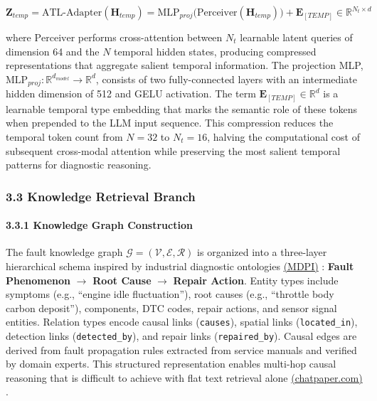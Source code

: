 \documentclass[
  11pt,
]{article}
\begin{document}
\[ \mathbf{Z}_{temp} = \text{ATL-Adapter}(\mathbf{H}_{temp}) = \text{MLP}_{proj}\bigl(\text{Perceiver}(\mathbf{H}_{temp})\bigr) + \mathbf{E}_{[TEMP]} \in \mathbb{R}^{N_t \times d} \tag{2} \]

where \(\text{Perceiver}\) performs cross-attention between \(N_t\)
learnable latent queries of dimension 64 and the \(N\) temporal hidden
states, producing compressed representations that aggregate salient
temporal information. The projection MLP,
\(\text{MLP}_{proj}: \mathbb{R}^{d_{model}} \rightarrow \mathbb{R}^{d}\),
consists of two fully-connected layers with an intermediate hidden
dimension of 512 and GELU activation. The term
\(\mathbf{E}_{[TEMP]} \in \mathbb{R}^{d}\) is a learnable temporal type
embedding that marks the semantic role of these tokens when prepended to
the LLM input sequence. This compression reduces the temporal token
count from \(N = 32\) to \(N_t = 16\), halving the computational cost of
subsequent cross-modal attention while preserving the most salient
temporal patterns for diagnostic reasoning.

\subsubsection{3.3 Knowledge Retrieval
Branch}\label{knowledge-retrieval-branch}

\paragraph{3.3.1 Knowledge Graph
Construction}\label{knowledge-graph-construction}

The fault knowledge graph
\(\mathcal{G} = (\mathcal{V}, \mathcal{E}, \mathcal{R})\) is organized
into a three-layer hierarchical schema inspired by industrial diagnostic
ontologies \href{https://www.mdpi.com/2079-9292/14/21/4180}{(MDPI)} :
\textbf{Fault Phenomenon} \(\rightarrow\) \textbf{Root Cause}
\(\rightarrow\) \textbf{Repair Action}. Entity types include symptoms
(e.g., ``engine idle fluctuation''), root causes (e.g., ``throttle body
carbon deposit''), components, DTC codes, repair actions, and sensor
signal entities. Relation types encode causal links (\texttt{causes}),
spatial links (\texttt{located\_in}), detection links
(\texttt{detected\_by}), and repair links (\texttt{repaired\_by}).
Causal edges are derived from fault propagation rules extracted from
service manuals and verified by domain experts. This structured
representation enables multi-hop causal reasoning that is difficult to
achieve with flat text retrieval alone
\href{https://chatpaper.com/chatpaper/paper/140970}{(chatpaper.com)} .
\end{document}
